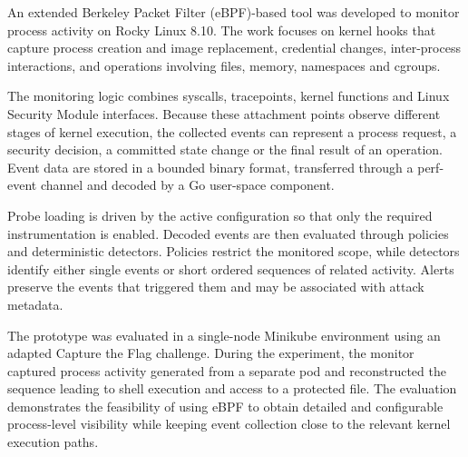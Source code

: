An extended Berkeley Packet Filter (eBPF)-based tool was developed to monitor process activity on Rocky Linux 8.10. The work focuses on kernel hooks that capture process creation and image replacement, credential changes, inter-process interactions, and operations involving files, memory, namespaces and cgroups.

The monitoring logic combines syscalls, tracepoints, kernel functions and Linux Security Module interfaces. Because these attachment points observe different stages of kernel execution, the collected events can represent a process request, a security decision, a committed state change or the final result of an operation. Event data are stored in a bounded binary format, transferred through a perf-event channel and decoded by a Go user-space component.

Probe loading is driven by the active configuration so that only the required instrumentation is enabled. Decoded events are then evaluated through policies and deterministic detectors. Policies restrict the monitored scope, while detectors identify either single events or short ordered sequences of related activity. Alerts preserve the events that triggered them and may be associated with \gls{attack} metadata.

The prototype was evaluated in a single-node Minikube environment using an adapted Capture the Flag challenge. During the experiment, the monitor captured process activity generated from a separate pod and reconstructed the sequence leading to shell execution and access to a protected file. The evaluation demonstrates the feasibility of using eBPF to obtain detailed and configurable process-level visibility while keeping event collection close to the relevant kernel execution paths.
